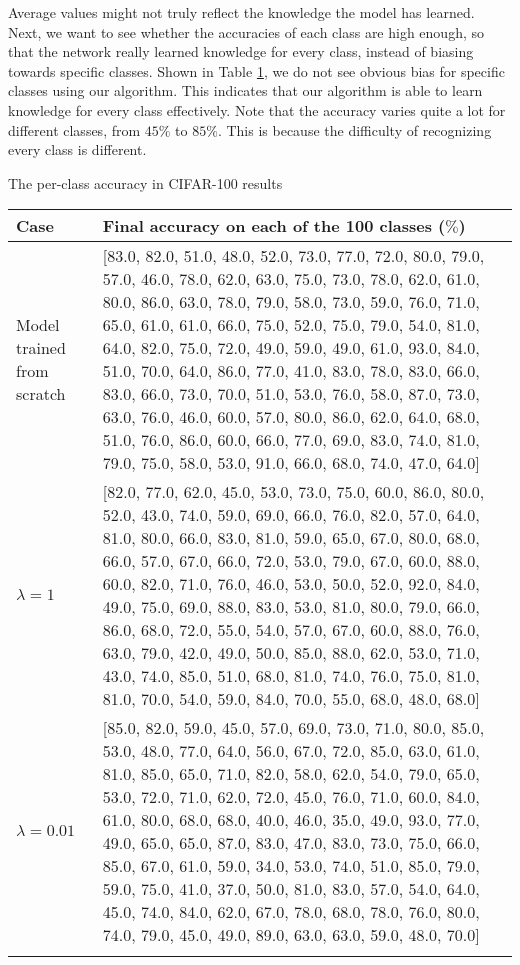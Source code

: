 Average values might not truly reflect the knowledge the model has learned. Next, we want to see whether the accuracies of each class are high enough, so that the network really learned knowledge for every class, instead of biasing towards specific classes. Shown in Table \ref{tab:cifar100}, we do not see obvious bias for specific classes using our algorithm. This indicates that our algorithm is able to learn knowledge for every class effectively. Note that the accuracy varies quite a lot for different classes, from $45\%$ to $85\%$. This is because the difficulty of recognizing every class is different.
\begin{table}[!hpb]
	\centering
	{The per-class accuracy in CIFAR-100 results}
	\label{tab:firstone}
	\begin{tabular}{@{}lp{10cm}@{}} \toprule
		Case &  Final accuracy on each of the 100 classes ($\%$)\\ \midrule
		Model trained from scratch  &[83.0, 82.0, 51.0, 48.0, 52.0, 73.0, 77.0, 72.0, 80.0, 79.0, 57.0, 46.0, 78.0, 62.0, 63.0, 75.0, 73.0, 78.0, 62.0, 61.0, 80.0, 86.0, 63.0, 78.0, 79.0, 58.0, 73.0, 59.0, 76.0, 71.0, 65.0, 61.0, 61.0, 66.0,
		75.0, 52.0, 75.0, 79.0, 54.0, 81.0, 64.0, 82.0, 75.0, 72.0, 49.0, 59.0, 49.0, 61.0, 93.0, 84.0, 51.0, 70.0, 64.0, 86.0, 77.0, 41.0, 83.0, 78.0, 83.0, 66.0, 83.0, 66.0, 73.0, 70.0, 51.0, 53.0, 76.0, 58.0,
		87.0, 73.0, 63.0, 76.0, 46.0, 60.0, 57.0, 80.0, 86.0, 62.0, 64.0, 68.0, 51.0, 76.0, 86.0, 60.0, 66.0, 77.0, 69.0, 83.0, 74.0, 81.0, 79.0, 75.0, 58.0, 53.0, 91.0, 66.0, 68.0, 74.0, 47.0, 64.0]\\
		$\lambda=1$  &[82.0, 77.0, 62.0, 45.0, 53.0, 73.0, 75.0, 60.0, 86.0, 80.0, 52.0, 43.0, 74.0, 59.0, 69.0, 66.0, 76.0, 82.0, 57.0, 64.0, 81.0, 80.0, 66.0, 83.0, 81.0, 59.0, 65.0, 67.0, 80.0, 68.0, 66.0, 57.0, 67.0, 66.0, 72.0, 53.0, 79.0, 67.0, 60.0, 88.0, 60.0, 82.0, 71.0, 76.0, 46.0, 53.0, 50.0, 52.0, 92.0, 84.0, 49.0, 75.0, 69.0, 88.0, 83.0, 53.0, 81.0, 80.0, 79.0, 66.0, 86.0, 68.0, 72.0, 55.0, 54.0, 57.0, 67.0, 60.0, 88.0, 76.0, 63.0, 79.0, 42.0, 49.0, 50.0, 85.0, 88.0, 62.0, 53.0, 71.0, 43.0, 74.0, 85.0, 51.0, 68.0, 81.0, 74.0, 76.0, 75.0, 81.0, 81.0, 70.0, 54.0, 59.0, 84.0, 70.0, 55.0, 68.0, 48.0, 68.0]
		\\
		$\lambda=0.01$  & [85.0, 82.0, 59.0, 45.0, 57.0, 69.0, 73.0, 71.0, 80.0, 85.0, 53.0, 48.0, 77.0, 64.0, 56.0, 67.0, 72.0, 85.0, 63.0, 61.0, 81.0, 85.0, 65.0, 71.0, 82.0, 58.0, 62.0, 54.0, 79.0, 65.0, 53.0, 72.0, 71.0, 62.0, 72.0, 45.0, 76.0, 71.0, 60.0, 84.0, 61.0, 80.0, 68.0, 68.0, 40.0, 46.0, 35.0, 49.0, 93.0, 77.0, 49.0, 65.0, 65.0, 87.0, 83.0, 47.0, 83.0, 73.0, 75.0, 66.0, 85.0, 67.0, 61.0, 59.0, 34.0, 53.0, 74.0, 51.0, 85.0, 79.0, 59.0, 75.0, 41.0, 37.0, 50.0, 81.0, 83.0, 57.0, 54.0, 64.0, 45.0, 74.0, 84.0, 62.0, 67.0, 78.0, 68.0, 78.0, 76.0, 80.0, 74.0, 79.0, 45.0, 49.0, 89.0, 63.0, 63.0, 59.0, 48.0, 70.0]
		 \\
\label{tab:cifar100}
	\end{tabular}
\end{table}


